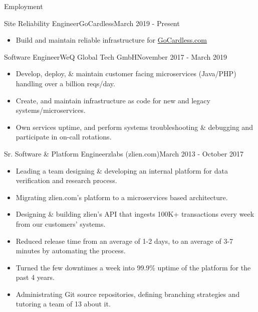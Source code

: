 \documentclass[]{mosabcv}
\begin{document}
\makeheader

\begin{cvsection}{Employment}
  \begin{cvsubsection}{Site Reliability Engineer}{GoCardless}{March 2019 - Present}
    \begin{itemize}
      \item Build and maintain reliable infrastructure for \href{https://www.gocardless.com}{GoCardless.com}
    \end{itemize}
  \end{cvsubsection}

  \begin{cvsubsection}{Software Engineer}{WeQ Global Tech GmbH}{November 2017 - March 2019}
    \begin{itemize}
      \item Develop, deploy, \& maintain customer facing microservices (Java/PHP) handling over a billion reqs/day.
      \item Create, and maintain infrastructure as code for new and legacy systems/microservices.
      \item Own services uptime, and perform systems troubleshooting \& debugging and participate in on-call rotations.
    \end{itemize}
  \end{cvsubsection}

  \begin{cvsubsection}{Sr. Software \& Platform Engineer}{zlabs (zlien.com)}{March 2013 - October 2017}
    \begin{itemize}
      \item Leading a team designing \& developing an internal platform for data verification and research process.
      \item Migrating zlien.com's platform to a microservices based architecture.
      \item Designing \& building zlien's API that ingests 100K+ transactions every week from our customers' systems.
      \item Reduced release time from an average of 1-2 days, to an average of 3-7 minutes by automating the process.
      \item Turned the few downtimes a week into 99.9\% uptime of the platform for the past 4 years.
      \item Administrating Git source repositories, defining branching strategies and tutoring a team of 13 about it.
    \end{itemize}
  \end{cvsubsection}


\end{cvsection}
\end{document}
